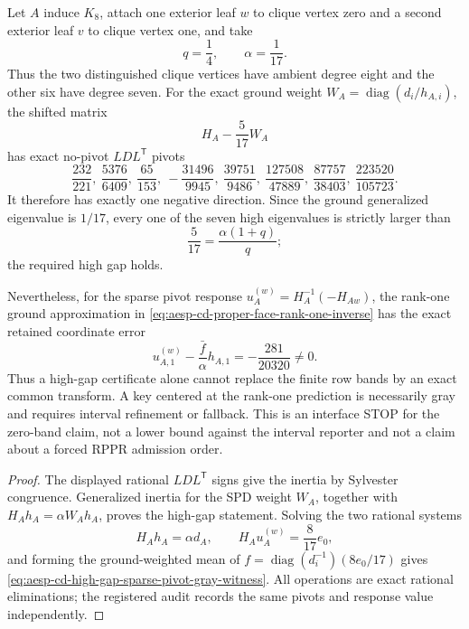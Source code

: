 \begin{proposition}
\label{prop:aesp-cd-high-gap-sparse-pivot-gray-stop}
Let \(A\) induce \(K_8\), attach one exterior leaf \(w\) to clique vertex
zero and a second exterior leaf \(v\) to clique vertex one, and take
\begin{equation*}
 q=\frac14,\qquad \alpha=\frac1{17}.
\end{equation*}
Thus the two distinguished clique vertices have ambient degree eight and the
other six have degree seven.  For the exact ground weight
\(W_A=\operatorname{diag}(d_i/h_{A,i})\), the shifted matrix
\begin{equation*}
 H_A-\frac5{17}W_A
\end{equation*}
has exact no-pivot \(LDL^{\mathsf T}\) pivots
\begin{equation*}
 \frac{232}{221},\
 \frac{5376}{6409},\
 \frac{65}{153},\
 -\frac{31496}{9945},\
 \frac{39751}{9486},\
 \frac{127508}{47889},\
 \frac{87757}{38403},\
 \frac{223520}{105723}.
\end{equation*}
It therefore has exactly one negative direction.  Since the ground
generalized eigenvalue is \(1/17\), every one of the seven high eigenvalues
is strictly larger than
\begin{equation*}
 \frac5{17}=\frac{\alpha(1+q)}q;
\end{equation*}
the required high gap holds.

Nevertheless, for the sparse pivot response
\(u_A^{(w)}=H_A^{-1}(-H_{Aw})\), the rank-one ground approximation in
\cref{eq:aesp-cd-proper-face-rank-one-inverse} has the exact retained
coordinate error
\begin{equation}
 u_{A,1}^{(w)}-\frac{\bar f}{\alpha}h_{A,1}
 =-\frac{281}{20320}\neq0.
 \label{eq:aesp-cd-high-gap-sparse-pivot-gray-witness}
\end{equation}
Thus a high-gap certificate alone cannot replace the finite row bands by an
exact common transform.  A key centered at the rank-one prediction is
necessarily gray and requires interval refinement or fallback.  This is an
interface STOP for the zero-band claim, not a lower bound against the
interval reporter and not a claim about a forced RPPR admission order.
\end{proposition}

\begin{proof}
The displayed rational \(LDL^{\mathsf T}\) signs give the inertia by Sylvester
congruence.  Generalized inertia for the SPD weight \(W_A\), together with
\(H_Ah_A=\alpha W_Ah_A\), proves the high-gap statement.  Solving the two
rational systems
\begin{equation*}
 H_Ah_A=\alpha d_A,
 \qquad
 H_Au_A^{(w)}=\frac8{17}e_0,
\end{equation*}
and forming the ground-weighted mean of
\(f=\operatorname{diag}(d_i^{-1})(8e_0/17)\) gives
\cref{eq:aesp-cd-high-gap-sparse-pivot-gray-witness}.  All operations are
exact rational eliminations; the registered audit records the same pivots
and response value independently.
\end{proof}

